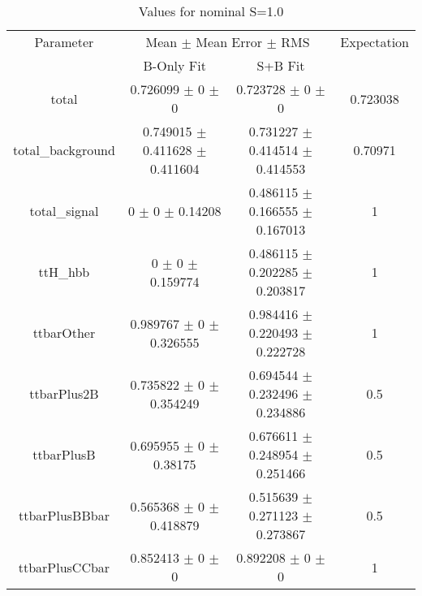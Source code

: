 \begin{table}
\centering
\caption{Values for nominal S=1.0}
\begin{tabular}{cccc}
\toprule
Parameter & \multicolumn{2}{c}{Mean $\pm$ Mean Error $\pm$ RMS} & Expectation\\
 & B-Only Fit & S+B Fit & \\
\midrule
total & \num{0.726099} $\pm$ \num{0} $\pm$ \num{0} & \num{0.723728} $\pm$ \num{0} $\pm$ \num{0} & \num{0.723038}\\
total\_background & \num{0.749015} $\pm$ \num{0.411628} $\pm$ \num{0.411604} & \num{0.731227} $\pm$ \num{0.414514} $\pm$ \num{0.414553} & \num{0.70971}\\
total\_signal & \num{0} $\pm$ \num{0} $\pm$ \num{0.14208} & \num{0.486115} $\pm$ \num{0.166555} $\pm$ \num{0.167013} & \num{1}\\
ttH\_hbb & \num{0} $\pm$ \num{0} $\pm$ \num{0.159774} & \num{0.486115} $\pm$ \num{0.202285} $\pm$ \num{0.203817} & \num{1}\\
ttbarOther & \num{0.989767} $\pm$ \num{0} $\pm$ \num{0.326555} & \num{0.984416} $\pm$ \num{0.220493} $\pm$ \num{0.222728} & \num{1}\\
ttbarPlus2B & \num{0.735822} $\pm$ \num{0} $\pm$ \num{0.354249} & \num{0.694544} $\pm$ \num{0.232496} $\pm$ \num{0.234886} & \num{0.5}\\
ttbarPlusB & \num{0.695955} $\pm$ \num{0} $\pm$ \num{0.38175} & \num{0.676611} $\pm$ \num{0.248954} $\pm$ \num{0.251466} & \num{0.5}\\
ttbarPlusBBbar & \num{0.565368} $\pm$ \num{0} $\pm$ \num{0.418879} & \num{0.515639} $\pm$ \num{0.271123} $\pm$ \num{0.273867} & \num{0.5}\\
ttbarPlusCCbar & \num{0.852413} $\pm$ \num{0} $\pm$ \num{0} & \num{0.892208} $\pm$ \num{0} $\pm$ \num{0} & \num{1}\\
\bottomrule
\end{tabular}
\end{table}